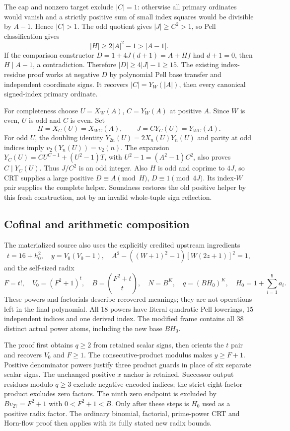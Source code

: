 The cap and nonzero target exclude $|C|=1$: otherwise all primary ordinates
would vanish and a strictly positive sum of small index squares would be
divisible by $A-1$. Hence $|C|>1$. The odd quotient gives $|J|\ge C^2>1$,
so Pell classification gives
\[
 |H|\ge 2|A|^2-1>|A-1|.
\]
If the comparison constructor $D=1+4J(d+1)=A+Hf$ had $d+1=0$, then
$H\mid A-1$, a contradiction. Therefore $|D|\ge4|J|-1\ge15$.
The existing index-residue proof works at negative $D$ by polynomial Pell
base transfer and independent coordinate signs. It recovers
$|C|=Y_W(|A|)$, then every canonical signed-index primary ordinate.

For completeness choose $U=X_W(A)$, $C=Y_W(A)$ at positive $A$.
Since $W$ is even, $U$ is odd and $C$ is even. Set
\[
 H=X_C(U)=X_{WC}(A),\qquad
 J=C Y_C(U)=Y_{WC}(A).
\]
For odd $U$, the doubling identity $Y_{2n}(U)=2X_n(U)Y_n(U)$ and parity
at odd indices imply $v_2(Y_n(U))=v_2(n)$. The expansion
$Y_C(U)=CU^{C-1}+(U^2-1)T$, with
$U^2-1=(A^2-1)C^2$, also proves $C\mid Y_C(U)$.
Thus $J/C^2$ is an odd integer.
Also $H$ is odd and coprime to $4J$, so CRT supplies a large positive
$D\equiv A\pmod H$, $D\equiv1\pmod{4J}$. Its index-$W$ pair supplies
the complete helper. Soundness restores the old positive helper by this
fresh construction, not by an invalid whole-tuple sign reflection.

\subsection{Cofinal and arithmetic composition}
The materialized source also uses the explicitly credited upstream ingredients
\[
 t=16+h_0^2,\quad y=V_0(V_0-1),\quad
 A^2-((W+1)^2-1)[W(2z+1)]^2=1,
\]
and the self-sized radix
\[
 F=t!,\quad V_0=(F^2+1)^t,\quad B=\binom{F^2+t}{t},\quad
 N=B^K,\quad q=(BH_0)^K,\quad H_0=1+\sum_{i=1}^9 a_i.
\]
These powers and factorials describe recovered meanings; they are not operations
left in the final polynomial. All 18 powers have literal quadratic Pell
lowerings, 15 independent indices and one derived index. The modified frame
contains all 38 distinct actual power atoms, including the new base $BH_0$.

The proof first obtains $q\ge2$ from retained scalar signs, then orients the
$t$ pair and recovers $V_0$ and $F\ge1$. The consecutive-product modulus
makes $y\ge F+1$. Positive denominator powers justify three product guards
in place of six separate scalar signs. The unchanged positive $x$ anchor
is retained. Successor output residues modulo $q\ge3$ exclude negative
encoded indices; the strict eight-factor product excludes zero factors.
The ninth zero endpoint is excluded by
$Bv_{27}=F^2+1$ with $0<F^2+1<B$. Only after these steps is $H_0$ used
as a positive radix factor. The ordinary binomial, factorial, prime-power CRT
and Horn-flow proof then applies with its fully stated new radix bounds.

